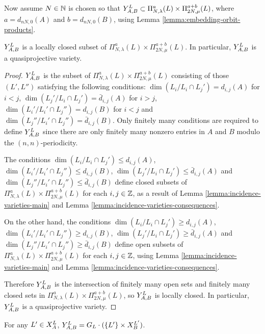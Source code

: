\documentclass[a4paper, 11pt]{report}
\begin{document}
Now assume $N\in\naturals$ is chosen so that $\yprod[L]{A,B}\subset\Pi_{N,\lambda}^a(L)\times\Pi_{2N,\mu}^{a+b}(L)$, where $a=d_{nN,0}{(A)}$ and $b=d_{nN,0}{(B)}$, using Lemma \ref{lemma:embedding-orbit-products}.

\begin{lemma}\label{lemma:y-prod-is-quasiprojective}
$\yprod[L]{A,B}$ is a locally closed subset of $\Pi_{N,\lambda}^a(L)\times\Pi_{2N,\mu}^{a+b}(L)$. In particular, $\yprod[L]{A,B}$ is a quasiprojective variety.
\end{lemma}

\begin{proof}
$\yprod[L]{A,B}$ is the subset of $\Pi_{N,\lambda}^a(L)\times\Pi_{2N,\mu}^{a+b}(L)$ consisting of those $(L',L'')$ satisfying the following conditions: $\dim(L_i/{L_i\cap L_j'}) = d_{i,j}{(A)}$ for $i<j$, $\dim(L_j'/{L_i\cap L_j'})=\bar{d}_{i,j}{(A)}$ for $i>j$, $\dim(L_i'/{L_i'\cap L_j''})=d_{i,j}{(B)}$ for $i<j$ and $\dim(L_j''/{L_i'\cap L_j''})=\bar{d}_{i,j}{(B)}$. Only finitely many conditions are required to define $\yprod[L]{A,B}$ since there are only finitely many nonzero entries in $A$ and $B$ modulo the $(n,n)$-periodicity.

The conditions $\dim(L_i/{L_i\cap L_j'})\le d_{i,j}{(A)}$, $\dim(L_i'/{L_i'\cap L_j''})\le d_{i,j}{(B)}$, $\dim(L_j'/{L_i\cap L_j'})\le\bar{d}_{i,j}{(A)}$ and $\dim(L_j''/{L_i'\cap L_j''})\le\bar{d}_{i,j}{(B)}$ define closed subsets of $\Pi_{N,\lambda}^a(L)\times\Pi_{2N,\mu}^{a+b}(L)$ for each $i,j\in\integers$, as a result of Lemma \ref{lemma:incidence-varieties-main} and Lemma \ref{lemma:incidence-varieties-consequences}.

On the other hand, the conditions $\dim(L_i/{L_i\cap L_j'})\geq d_{i,j}{(A)}$, $\dim(L_i'/{L_i'\cap L_j''})\geq d_{i,j}{(B)}$, $\dim(L_j'/{L_i\cap L_j'})\geq\bar{d}_{i,j}{(A)}$ and $\dim(L_j''/{L_i'\cap L_j''})\geq\bar{d}_{i,j}{(B)}$ define open subsets of $\Pi_{N,\lambda}^a(L)\times\Pi_{2N,\mu}^{a+b}(L)$ for each $i,j\in\integers$, using Lemma \ref{lemma:incidence-varieties-main} and Lemma \ref{lemma:incidence-varieties-consequences}.

Therefore $\yprod[L]{A,B}$ is the intersection of finitely many open sets and finitely many closed sets in $\Pi_{N,\lambda}^a(L)\times\Pi_{2N,\mu}^{a+b}(L)$, so $\yprod[L]{A,B}$ is locally closed. In particular, $\yprod[L]{A,B}$ is a quasiprojective variety.
\end{proof}

\begin{lemma}\label{lemma:yprod-as-a-saturation}
For any $L'\in\xprod[L]{A}$, $\yprod[L]{A,B} = G_L\cdot(\{L'\}\times\xprod[L']{B})$.
\end{lemma}
\end{document}
